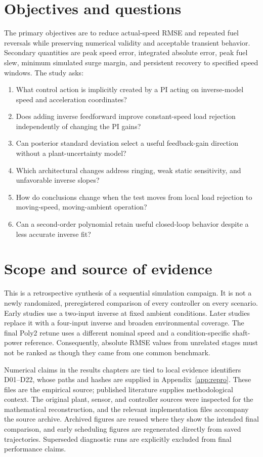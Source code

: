 \documentclass[11pt,a4paper,oneside]{report}
\begin{document}
\section{Objectives and questions}
The primary objectives are to reduce actual-speed RMSE and repeated fuel reversals while preserving numerical validity and acceptable transient behavior. Secondary quantities are peak speed error, integrated absolute error, peak fuel slew, minimum simulated surge margin, and persistent recovery to specified speed windows. The study asks:
\begin{enumerate}
\item What control action is implicitly created by a PI acting on inverse-model speed and acceleration coordinates?
\item Does adding inverse feedforward improve constant-speed load rejection independently of changing the PI gains?
\item Can posterior standard deviation select a useful feedback-gain direction without a plant-uncertainty model?
\item Which architectural changes address ringing, weak static sensitivity, and unfavorable inverse slopes?
\item How do conclusions change when the test moves from local load rejection to moving-speed, moving-ambient operation?
\item Can a second-order polynomial retain useful closed-loop behavior despite a less accurate inverse fit?
\end{enumerate}

\section{Scope and source of evidence}
This is a retrospective synthesis of a sequential simulation campaign. It is not a newly randomized, preregistered comparison of every controller on every scenario. Early studies use a two-input inverse at fixed ambient conditions. Later studies replace it with a four-input inverse and broaden environmental coverage. The final Poly2 retune uses a different nominal speed and a condition-specific shaft-power reference. Consequently, absolute RMSE values from unrelated stages must not be ranked as though they came from one common benchmark.

Numerical claims in the results chapters are tied to local evidence identifiers D01--D22, whose paths and hashes are supplied in Appendix~\ref{app:repro}. These files are the empirical source; published literature supplies methodological context. The original plant, sensor, and controller sources were inspected for the mathematical reconstruction, and the relevant implementation files accompany the source archive. Archived figures are reused where they show the intended final comparison, and early scheduling figures are regenerated directly from saved trajectories. Superseded diagnostic runs are explicitly excluded from final performance claims.
\end{document}
